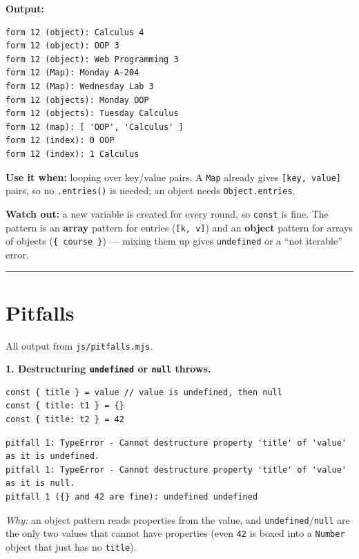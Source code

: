 \documentclass[
  10pt,
]{article}
\begin{document}
\textbf{Output:}

\begin{verbatim}
form 12 (object): Calculus 4
form 12 (object): OOP 3
form 12 (object): Web Programming 3
form 12 (Map): Monday A-204
form 12 (Map): Wednesday Lab 3
form 12 (objects): Monday OOP
form 12 (objects): Tuesday Calculus
form 12 (map): [ 'OOP', 'Calculus' ]
form 12 (index): 0 OOP
form 12 (index): 1 Calculus
\end{verbatim}

\textbf{Use it when:} looping over key/value pairs. A \texttt{Map}
already gives \texttt{{[}key,\ value{]\allowbreak{}}} pairs, so no
\texttt{.\allowbreak{}entries()} is needed; an object needs
\texttt{Object.\allowbreak{}entries}.

\textbf{Watch out:} a new variable is created for every round, so
\texttt{const} is fine. The pattern is an \textbf{array} pattern for
entries (\texttt{{[}k,\ v{]\allowbreak{}}}) and an \textbf{object}
pattern for arrays of objects (\texttt{\{\ course\ \}}) --- mixing them
up gives \texttt{undefined} or a ``not iterable'' error.

\begin{center}\rule{0.5\linewidth}{0.5pt}\end{center}

\hypertarget{pitfalls}{%
\section{Pitfalls}\label{pitfalls}}

All output from \texttt{js/\allowbreak{}pitfalls.\allowbreak{}mjs}.

\textbf{1. Destructuring \texttt{undefined} or \texttt{null} throws.}

\begin{verbatim}
const { title } = value // value is undefined, then null
const { title: t1 } = {}
const { title: t2 } = 42
\end{verbatim}

\begin{verbatim}
pitfall 1: TypeError - Cannot destructure property 'title' of 'value' as it is undefined.
pitfall 1: TypeError - Cannot destructure property 'title' of 'value' as it is null.
pitfall 1 ({} and 42 are fine): undefined undefined
\end{verbatim}

\emph{Why:} an object pattern reads properties from the value, and
\texttt{undefined}/\texttt{null} are the only two values that cannot
have properties (even \texttt{42} is boxed into a \texttt{Number} object
that just has no \texttt{title}).
\end{document}
